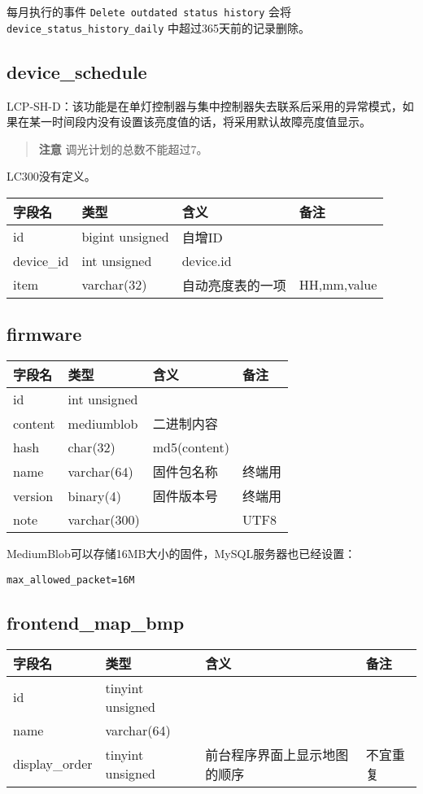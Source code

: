 每月执行的事件 \texttt{Delete outdated status history} 会将
\texttt{device\_status\_history\_daily} 中超过365天前的记录删除。

\subsection{device\_schedule}\label{deviceux5fschedule}

LCP-SH-D：该功能是在单灯控制器与集中控制器失去联系后采用的异常模式，如果在某一时间段内没有设置该亮度值的话，将采用默认故障亮度值显示。

\begin{quote}
\textbf{注意} 调光计划的总数不能超过7。
\end{quote}

LC300没有定义。

\begin{longtabu}[c]{@{}lXXX@{}}
\toprule
字段名 & 类型 & 含义 & 备注\tabularnewline
\midrule
\endhead
id & bigint unsigned & 自增ID &\tabularnewline
device\_id & int unsigned & device.id &\tabularnewline
item & varchar(32) & 自动亮度表的一项 & HH,mm,value\tabularnewline
\bottomrule
\end{longtabu}

\subsection{firmware}\label{firmware}

\begin{longtabu}[c]{@{}lXXX@{}}
\toprule
字段名 & 类型 & 含义 & 备注\tabularnewline
\midrule
\endhead
id & int unsigned & &\tabularnewline
content & mediumblob & 二进制内容 &\tabularnewline
hash & char(32) & md5(content) &\tabularnewline
name & varchar(64) & 固件包名称 & 终端用\tabularnewline
version & binary(4) & 固件版本号 & 终端用\tabularnewline
note & varchar(300) & & UTF8\tabularnewline
\bottomrule
\end{longtabu}

MediumBlob可以存储16MB大小的固件，MySQL服务器也已经设置：

\texttt{max\_allowed\_packet=16M}

\subsection{frontend\_map\_bmp}\label{frontendux5fmapux5fbmp}

\begin{longtabu}[c]{@{}lXXX@{}}
\toprule
字段名 & 类型 & 含义 & 备注\tabularnewline
\midrule
\endhead
id & tinyint unsigned & &\tabularnewline
name & varchar(64) & &\tabularnewline
display\_order & tinyint unsigned & 前台程序界面上显示地图的顺序 &
不宜重复\tabularnewline
\bottomrule
\end{longtabu}

